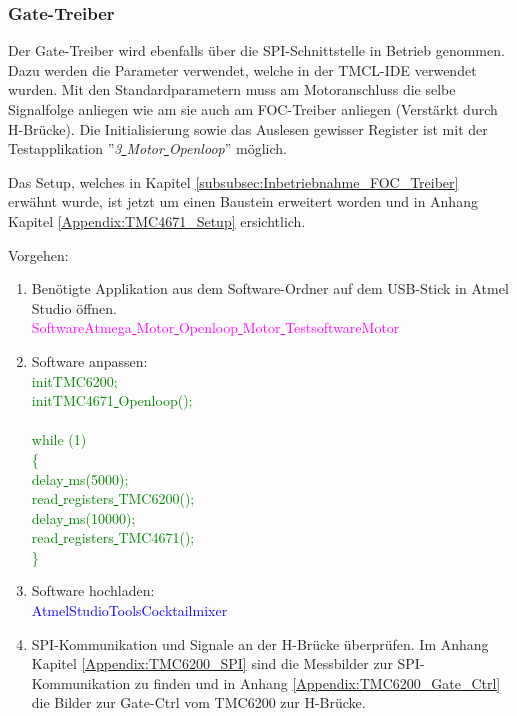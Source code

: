 \subsubsection{Gate-Treiber}
\label{subsubsec:Inbetriebnahme_Gate_Treiber}

Der Gate-Treiber wird ebenfalls über die SPI-Schnittstelle in Betrieb genommen. Dazu werden die Parameter verwendet, welche in der TMCL-IDE verwendet wurden. Mit den Standardparametern muss am Motoranschluss die selbe Signalfolge anliegen wie am sie auch am FOC-Treiber anliegen (Verstärkt durch H-Brücke). Die Initialisierung sowie das Auslesen gewisser Register ist mit der Testapplikation ''\textit{3\underline{ }Motor\underline{ }Openloop}'' möglich.

Das Setup, welches in Kapitel \ref{subsubsec:Inbetriebnahme_FOC_Treiber} erwähnt wurde, ist jetzt um einen Baustein erweitert worden und in Anhang Kapitel \ref{Appendix:TMC4671_Setup} ersichtlich.

Vorgehen:
\begin{enumerate}
\item Benötigte Applikation aus dem Software-Ordner auf dem USB-Stick in Atmel Studio öffnen.\\
\textcolor{magenta}{Software\textrightarrow Atmega\underline{ }Motor\underline{ }Openloop\underline{ }Motor\underline{ }Testsoftware\textrightarrow Motor}\\


\item Software anpassen:\\
\textcolor{green}{
	initTMC6200;\\
	initTMC4671\underline{ }Openloop();\\
\\
    while (1) \\
    \{\\
		\underline{ }delay\underline{ }ms(5000);\\
		read\underline{ }registers\underline{ }TMC6200();\\
		\underline{ }delay\underline{ }ms(10000);\\
		read\underline{ }registers\underline{ }TMC4671();\\
    \}
}\newline
\item Software hochladen:\\
\textcolor{blue}{AtmelStudio\textrightarrow Tools\textrightarrow Cocktailmixer}\\

\item SPI-Kommunikation und Signale an der H-Brücke überprüfen. Im Anhang Kapitel \ref{Appendix:TMC6200_SPI} sind die Messbilder zur SPI-Kommunikation zu finden und in Anhang \ref{Appendix:TMC6200_Gate_Ctrl} die Bilder zur Gate-Ctrl vom TMC6200 zur H-Brücke.

\end{enumerate}